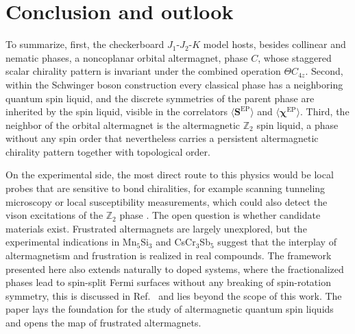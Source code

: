 \documentclass[11pt]{article}
\newcommand{\SEP}{\boldsymbol{S}^{\mathrm{EP}}}
\newcommand{\chiEP}{\boldsymbol{\chi}^{\mathrm{EP}}}
\begin{document}
\section{Conclusion and outlook}
\label{sec:conclusion}

To summarize, first, the checkerboard $J_1$-$J_2$-$K$
model hosts, besides collinear and nematic phases, a noncoplanar orbital
altermagnet, phase $C$, whose staggered scalar chirality pattern is invariant
under the combined operation $\Theta C_{4z}$. Second, within the Schwinger
boson construction every classical phase has a neighboring quantum spin liquid,
and the discrete symmetries of the parent phase are inherited by the spin
liquid, visible in the correlators $\langle \SEP \rangle$ and $\langle \chiEP
\rangle$. Third, the neighbor of the orbital altermagnet is the altermagnetic
$\mathbb{Z}_2$ spin liquid, a phase without any spin order that nevertheless
carries a persistent altermagnetic chirality pattern together with topological
order.

On the experimental side, the most direct route to this physics would be local
probes that are sensitive to bond chiralities, for example scanning tunneling
microscopy or local susceptibility measurements, which could also detect the
vison excitations of the $\mathbb{Z}_2$ phase \cite{Jahin2025}. The open
question is whether candidate materials exist. Frustrated altermagnets are
largely unexplored, but the experimental indications in Mn$_5$Si$_3$
\cite{Biniskos2022,Surgers2024} and CsCr$_3$Sb$_5$ \cite{Xu2025} suggest that
the interplay of altermagnetism and frustration is realized in real compounds.
The framework presented here also extends naturally to doped systems, where the
fractionalized phases lead to spin-split Fermi surfaces without any breaking of
spin-rotation symmetry, this is discussed in Ref.~\cite{Sobral2025} and lies
beyond the scope of this work. The paper lays the foundation for the study of
altermagnetic quantum spin liquids and opens the map of frustrated
altermagnets.

\printbibliography
\end{document}
